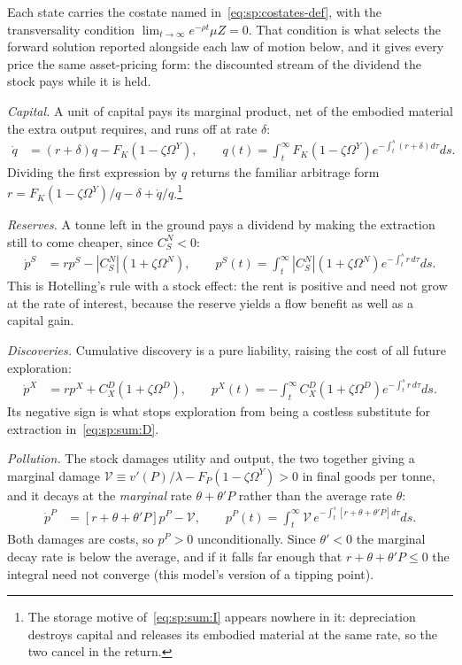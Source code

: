  Each state carries the costate named in~\eqref{eq:sp:costates-def}, with the transversality condition $\lim_{t\to\infty}e^{-\rho t}\mu Z=0$. That condition is what selects the forward solution reported alongside each law of motion below, and it gives every price the same asset-pricing form: the discounted stream of the dividend the stock pays while it is held.

\emph{Capital.} A unit of capital pays its marginal product, net of the embodied material the extra output requires, and runs off at rate $\delta$:
\begin{align}
\dot q &= \left(r+\delta\right)q-F_K\left(1-\zeta\Omega^Y\right),
\qquad
q\left(t\right)=\int_t^\infty F_K\left(1-\zeta\Omega^Y\right)e^{-\int_t^s\left(r+\delta\right)d\tau}ds .
\label{eq:sp:sum:K}
\end{align}
Dividing the first expression by $q$ returns the familiar arbitrage form $r=F_K\left(1-\zeta\Omega^Y\right)/q-\delta+\dot q/q$.\footnote{The storage motive of~\eqref{eq:sp:sum:I} appears nowhere in it: depreciation destroys capital and releases its embodied material at the same rate, so the two cancel in the return.}

\emph{Reserves.} A tonne left in the ground pays a dividend by making the extraction still to come cheaper, since $C^N_S<0$:
\begin{align}
\dot p^S &= rp^S-\left|C^N_S\right|\left(1+\zeta\Omega^N\right),
\qquad
p^S\left(t\right)=\int_t^\infty\left|C^N_S\right|\left(1+\zeta\Omega^N\right)e^{-\int_t^s r\,d\tau}ds .
\label{eq:sp:sum:S}
\end{align}
This is Hotelling's rule with a stock effect: the rent is positive and need not grow at the rate of interest, because the reserve yields a flow benefit as well as a capital gain.

\emph{Discoveries.} Cumulative discovery is a pure liability, raising the cost of all future exploration:
\begin{align}
\dot p^X &= rp^X+C^D_X\left(1+\zeta\Omega^D\right),
\qquad
p^X\left(t\right)=-\int_t^\infty C^D_X\left(1+\zeta\Omega^D\right)e^{-\int_t^s r\,d\tau}ds .
\label{eq:sp:sum:X}
\end{align}
Its negative sign is what stops exploration from being a costless substitute for extraction in~\eqref{eq:sp:sum:D}.

\emph{Pollution.} The stock damages utility and output, the two together giving a marginal damage $\mathcal V\equiv v'\left(P\right)/\lambda-F_P\left(1-\zeta\Omega^Y\right)>0$ in final goods per tonne, and it decays at the \emph{marginal} rate $\theta+\theta'P$ rather than the average rate $\theta$:
\begin{align}
\dot p^P &= \left[r+\theta+\theta'P\right]p^P-\mathcal V,
\qquad
p^P\left(t\right)=\int_t^\infty\mathcal V\,e^{-\int_t^s\left[r+\theta+\theta'P\right]d\tau}ds .
\label{eq:sp:sum:P}
\end{align}
Both damages are costs, so $p^P>0$ unconditionally. Since $\theta'<0$ the marginal decay rate is below the average, and if it falls far enough that $r+\theta+\theta'P\le0$ the integral need not converge (this model's version of a tipping point).

